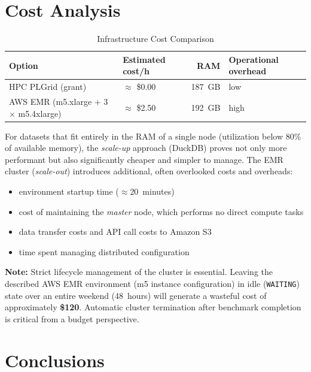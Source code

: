 \documentclass[12pt,a4paper]{article}
\begin{document}
\section{Cost Analysis}

\begin{table}[H]
  \centering
  \caption{Infrastructure Cost Comparison}
  \label{tab:costs}
  \begin{tabular}{llrl}
    \toprule
    \textbf{Option} & \textbf{Estimated cost/h} & \textbf{RAM} & \textbf{Operational overhead} \\
    \midrule
    HPC PLGrid (grant)                          & $\approx$ \$0.00 & 187~GB & low \\
    AWS EMR (m5.xlarge + 3$\times$ m5.4xlarge) & $\approx$ \$2.50 & 192~GB & high \\
    \bottomrule
  \end{tabular}
\end{table}

For datasets that fit entirely in the RAM of a single node (utilization below 80\%
of available memory), the \textit{scale-up} approach (DuckDB) proves not only more
performant but also significantly cheaper and simpler to manage. The EMR cluster
(\textit{scale-out}) introduces additional, often overlooked costs and overheads:

\begin{itemize}
  \item environment startup time ($\approx$20~minutes)
  \item cost of maintaining the \textit{master} node, which performs no direct
        compute tasks
  \item data transfer costs and API call costs to Amazon S3
  \item time spent managing distributed configuration
\end{itemize}

\textbf{Note:} Strict lifecycle management of the cluster is essential. Leaving the
described AWS EMR environment (m5 instance configuration) in idle (\texttt{WAITING})
state over an entire weekend (48~hours) will generate a wasteful cost of approximately
\textbf{\$120}. Automatic cluster termination after benchmark completion is critical
from a budget perspective.

\section{Conclusions}
\end{document}
